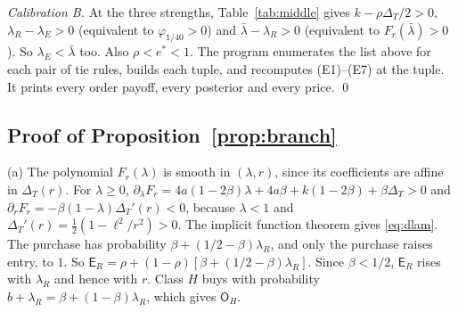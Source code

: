 \documentclass[12pt]{article}
\theoremstyle{definition}
\theoremstyle{remark}
\newcommand{\Ent}{\mathsf E}
\newcommand{\Own}{\mathsf O}
\newcommand{\DT}{\Delta_T}
\newcommand{\lb}{\bar\lambda}
\begin{document}
\emph{Calibration B.} At the three strengths, Table~\ref{tab:middle} gives $k-\rho\DT/2>0$,
$\lambda_R-\lambda_E>0$ (equivalent to $\varphi_{1/40}>0$) and $\lb-\lambda_R>0$ (equivalent to $F_r(\lb)>0$). So
$\lambda_E<\lb$ too. Also $\rho<e^*<1$. The program enumerates the list above for each pair of tie rules, builds
each tuple, and recomputes (E1)--(E7) at the tuple. It prints every order payoff, every posterior and every price. \qed

\subsection{Proof of Proposition~\ref{prop:branch}}

(a) The polynomial $F_r(\lambda)$ is smooth in $(\lambda,r)$, since its coefficients are affine in $\DT(r)$. For
$\lambda\ge0$, $\partial_\lambda F_r=4a(1-2\beta)\lambda+4a\beta+k(1-2\beta)+\beta\DT>0$ and
$\partial_rF_r=-\beta(1-\lambda)\DT'(r)<0$, because $\lambda<1$ and $\DT'(r)=\frac12(1-\ell^2/r^2)>0$. The implicit
function theorem gives \eqref{eq:dlam}. The purchase has probability $\beta+(1/2-\beta)\lambda_R$, and only the
purchase raises entry, to $1$. So $\Ent_R=\rho+(1-\rho)[\beta+(1/2-\beta)\lambda_R]$. Since $\beta<1/2$, $\Ent_R$ rises
with $\lambda_R$ and hence with $r$. Class $H$ buys with probability $\hat b+\lambda_R=\beta+(1-\beta)\lambda_R$, which
gives $\Own_H$.
\end{document}
